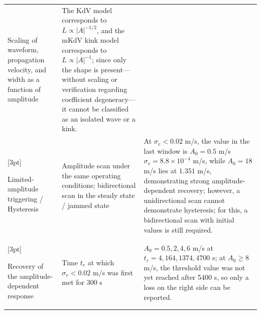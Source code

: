 \documentclass[11pt,a4paper,openany]{book}
\numberwithin{equation}{chapter}
\numberwithin{figure}{chapter}
\numberwithin{table}{chapter}
\begin{document}
\begin{center}
\begin{tabular}{p{2.7cm}p{4.4cm}p{6.1cm}}
Scaling of waveform, propagation velocity, and width as a function of amplitude






&






The KdV model corresponds to $L\propto |A|^{-1/2}$, and the mKdV kink model corresponds to $L\propto |A|^{-1}$; since only the shape is present—without scaling or verification regarding coefficient degeneracy—it cannot be classified as an isolated wave or a kink.

\\

[3pt]

Limited-amplitude triggering / Hysteresis






&






Amplitude scan under the same operating conditions; bidirectional scan in the steady state / jammed state






&






At $\sigma_v<0.02$ m/s, the value in the last window is $A_0=0.5$ m/s $\sigma_v=8.8\times10^{-4}$ m/s, while $A_0=18$ m/s lies at $1.351$ m/s, demonstrating strong amplitude-dependent recovery; however, a unidirectional scan cannot demonstrate hysteresis; for this, a bidirectional scan with initial values ​​is still required.





\\

[3pt]

Recovery of the amplitude-dependent response






&






Time $t_r$ at which $\sigma_v<0.02$ m/s was first met for 300 s






&






$A_0=0.5,2,4,6$ m/s at $t_r=4,164,1374,4700$ s; at $A_0\ge8$ m/s, the threshold value was not yet reached after 5400 s, so only a loss on the right side can be reported.





\\
\bottomrule
\end{tabular}
\end{center}
\end{document}
